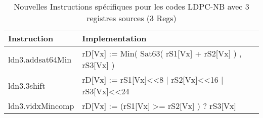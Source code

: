     
\begin{table}[tb]
  \centering
  
      \begin{tabular}{l || l l }
      \toprule
          Instruction & Implementation \\
          \midrule 
          ldn3.addsat64Min &   rD{[}Vx{]} := Min( Sat63( rS1{[}Vx{]} +  rS2{[}Vx{]} ) ,  rS3{[}Vx{]} ) \\
          \midrule
          ldn3.3shift &  rD{[}Vx{]} :=  rS1{[}Vx{]}<<8 | rS2{[}Vx{]}<<16 | rS3{[}Vx{]}<<24 \\ \midrule
          ldn3.vidxMincomp & rD{[}Vx{]} := (rS1{[}Vx{]} >= rS2{[}Vx{]} ) ?
          rS3{[}Vx{]} \\
      \bottomrule
      \end{tabular}
  
    \caption{Nouvelles Instructions spécifiques pour les codes LDPC-NB avec 
  3 registres sources (3 Regs) }
  \label{tab:instrus_ldpcnb_3reg}
  \end{table}